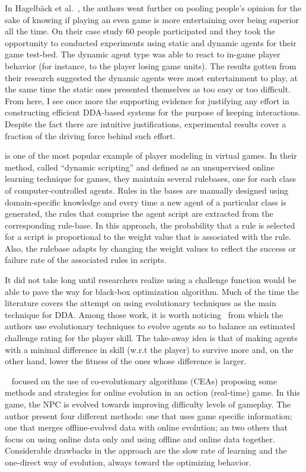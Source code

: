 In Hagelbäck et al.~\cite{hagelback_measuring_2009}, the authors went further on pooling people's opinion for the sake of knowing if playing an even game is more entertaining over being superior all the time. On their case study 60 people participated and they took the opportunity to conducted experiments using static and dynamic agents for their game test-bed. The dynamic agent type was able to react to in-game player behavior (for instance, to the player losing game units). The results gotten from their research suggested the dynamic agents were most entertainment to play, at the same time the static ones presented themselves as too easy or too difficult. From here, I see once more the supporting evidence for justifying any effort in constructing efficient DDA-based systems for the purpose of keeping interactions. Despite the fact there are intuitive justifications, experimental results cover a fraction of the driving force behind such effort.

\cite{spronck_-line_2004} is one of the most popular example of player modeling in virtual games. In their method, called ``dynamic scripting'' and defined as an unsupervised online learning technique for games, they maintain several rulebases, one for each class of computer-controlled agents. Rules in the bases are manually designed using domain-specific knowledge and every time a new agent of a particular class is generated, the rules that comprise the agent script are extracted from the corresponding rule-base. In this approach, the probability that a rule is selected for a script is proportional to the weight value that is associated with the rule. Also, the rulebase adapts by changing the weight values to reflect the success or failure rate of the associated rules in scripts.

It did not take long until researchers realize using a challenge function would be able to pave the way for black-box optimization algorithm. Much of the time the literature covers the attempt on using evolutionary techniques as the main technique for DDA. Among those work, it is worth noticing~\cite{olesen_real-time_2008} from which the authors use evolutionary techniques to evolve agents so to balance an estimated challenge rating for the player skill. The take-away idea is that of making agents with a minimal difference in skill (w.r.t the player) to survive more and, on the other hand, lower the fitness of the ones whose difference is larger.

~\cite{demasi_-line_2003} focused on the use of co-evolutionary algorithms (CEAs) proposing some methods and strategies for online evolution in an action (real-time) game. In this game, the NPC is evolved towards improving difficulty levels of gameplay. The author present four different methods: one that uses game specific information; one that merges offline-evolved data with online evolution; an two others that focus on using online data only and using offline and online data together. Considerable drawbacks in the approach are the slow rate of learning and the one-direct way of evolution, always toward the optimizing behavior.

